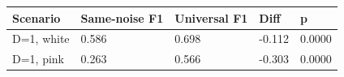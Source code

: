 \begin{tabular}{lllll}
\toprule
Scenario & Same-noise F1 & Universal F1 & Diff & p \\
\midrule
D=1, white & 0.586 & 0.698 & -0.112 & 0.0000 \\
D=1, pink & 0.263 & 0.566 & -0.303 & 0.0000 \\
\bottomrule
\end{tabular}

